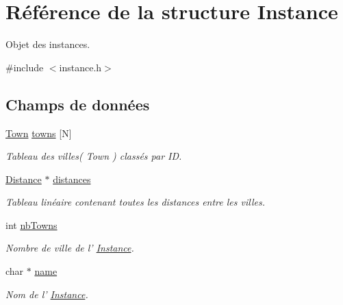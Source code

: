 \hypertarget{structInstance}{
\section{Référence de la structure Instance}
\label{structInstance}
}


Objet des instances.  




{\ttfamily \#include $<$instance.h$>$}

\subsection*{Champs de données}
\begin{DoxyCompactItemize}
\item 
\hypertarget{structInstance_a2087c5ae925e10c023ab75ae949b3a8c}{
\hyperlink{structTown}{Town} \hyperlink{structInstance_a2087c5ae925e10c023ab75ae949b3a8c}{towns} \mbox{[}N\mbox{]}}
\label{structInstance_a2087c5ae925e10c023ab75ae949b3a8c}

\begin{DoxyCompactList}\small\item\em Tableau des villes( Town ) classés par ID. \item\end{DoxyCompactList}\item 
\hypertarget{structInstance_a0712ff0f53a32bf39d8c6b46973892f7}{
\hyperlink{structDistance}{Distance} $\ast$ \hyperlink{structInstance_a0712ff0f53a32bf39d8c6b46973892f7}{distances}}
\label{structInstance_a0712ff0f53a32bf39d8c6b46973892f7}

\begin{DoxyCompactList}\small\item\em Tableau linéaire contenant toutes les distances entre les villes. \item\end{DoxyCompactList}\item 
\hypertarget{structInstance_aef5e944d6f236c31f03a4a9886e8ab99}{
int \hyperlink{structInstance_aef5e944d6f236c31f03a4a9886e8ab99}{nbTowns}}
\label{structInstance_aef5e944d6f236c31f03a4a9886e8ab99}

\begin{DoxyCompactList}\small\item\em Nombre de ville de l' \hyperlink{structInstance}{Instance}. \item\end{DoxyCompactList}\item 
\hypertarget{structInstance_a7822b9a12232dac563bd744f399cae76}{
char $\ast$ \hyperlink{structInstance_a7822b9a12232dac563bd744f399cae76}{name}}
\label{structInstance_a7822b9a12232dac563bd744f399cae76}

\begin{DoxyCompactList}\small\item\em Nom de l' \hyperlink{structInstance}{Instance}. \item\end{DoxyCompactList}\end{DoxyCompactItemize}


